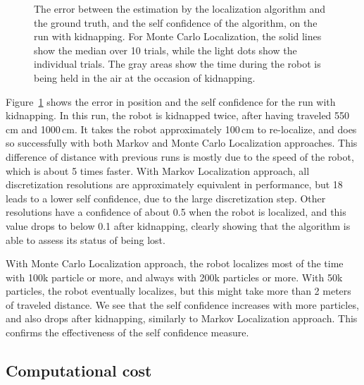 \documentclass[letterpaper, 10pt, conference]{ieeeconf}
\newcommand{\Fig}[1]{Figure~\ref{fig:#1}}
\begin{document}
\begin{figure}
\caption{The error between the estimation by the localization algorithm and the ground truth, and the self confidence of the algorithm, on the run with kidnapping.
For Monte Carlo Localization, the solid lines show the median over 10 trials, while the light dots show the individual trials.
The gray areas show the time during the robot is being held in the air at the occasion of kidnapping.}
\label{fig:whole-runs-random-long}
\end{figure}

\Fig{whole-runs-random-long} shows the error in position and the self confidence for the run with kidnapping.
In this run, the robot is kidnapped twice, after having traveled 550\,cm and 1000\,cm.
It takes the robot approximately 100\,cm to re-localize, and does so successfully with both Markov and Monte Carlo Localization approaches.
This difference of distance with previous runs is mostly due to the speed of the robot, which is about 5 times faster.
With Markov Localization approach, all discretization resolutions are approximately equivalent in performance, but 18 leads to a lower self confidence, due to the large discretization step.
Other resolutions have a confidence of about 0.5 when the robot is localized, and this value drops to below 0.1 after kidnapping, clearly showing that the algorithm is able to assess its status of being lost.

With Monte Carlo Localization approach, the robot localizes most of the time with 100k particle or more, and always with 200k particles or more.
With 50k particles, the robot eventually localizes, but this might take more than 2 meters of traveled distance.
We see that the self confidence increases with more particles, and also drops after kidnapping, similarly to Markov Localization approach.
This confirms the effectiveness of the self confidence measure.

\subsection{Computational cost}

\end{document}

